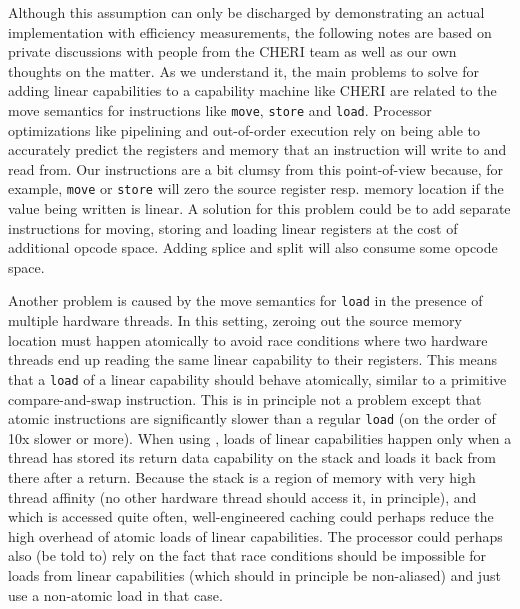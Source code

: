 \documentclass[acmsmall,screen]{acmart}\settopmatter{}
\begin{document}
Although this assumption can only be discharged by demonstrating an actual implementation with efficiency measurements, the following notes are based on private discussions with people from the CHERI team as well as our own thoughts on the matter.
As we understand it, the main problems to solve for adding linear capabilities to a capability machine like CHERI are related to the move semantics for instructions like \texttt{move}, \texttt{store} and \texttt{load}.
Processor optimizations like pipelining and out-of-order execution rely on being able to accurately predict the registers and memory that an instruction will write to and read from.
Our instructions are a bit clumsy from this point-of-view because, for example, \texttt{move} or \texttt{store} will zero the source register resp. memory location if the value being written is linear.
A solution for this problem could be to add separate instructions for moving, storing and loading linear registers at the cost of additional opcode space.
Adding splice and split will also consume some opcode space.

Another problem is caused by the move semantics for \texttt{load} in the presence of multiple hardware threads.
In this setting, zeroing out the source memory location must happen atomically to avoid race conditions where two hardware threads end up reading the same linear capability to their registers.
This means that a \texttt{load} of a linear capability should behave atomically, similar to a primitive compare-and-swap instruction.
This is in principle not a problem except that atomic instructions are significantly slower than a regular \texttt{load} (on the order of 10x slower or more).
When using \stktokens{}, loads of linear capabilities happen only when a thread has stored its return data capability on the stack and loads it back from there after a return.
Because the stack is a region of memory with very high thread affinity (no other hardware thread should access it, in principle), and which is accessed quite often, well-engineered caching could perhaps reduce the high overhead of atomic loads of linear capabilities.
The processor could perhaps also (be told to) rely on the fact that race conditions should be impossible for loads from linear capabilities (which should in principle be non-aliased) and just use a non-atomic load in that case.
\end{document}
